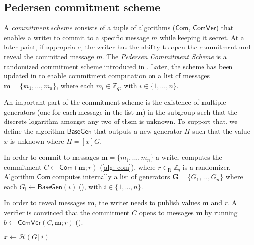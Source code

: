 \clearpage
\subsection{Pedersen commitment scheme}
A \textit{commitment scheme} consists of a tuple of algorithms ($\mathsf{Com}$, $\mathsf{ComVer}$) that enables a writer to commit to a specific message $m$ while keeping it secret. At a later point, if appropriate, the writer has the ability to open the commitment and reveal the committed message $m$. The \textit{Pedersen Commitment Scheme} is a randomized commitment scheme introduced in \cite{Pedersen91-commitment}. Later, the scheme has been updated in \cite{Bootle18} to enable commitment computation on a list of messages $\boldsymbol{m} = \{m_1, ..., m_n\}$, where each $m_i \in \mathbb{Z}_q$, with $i \in \{1, ..., n\}$.

An important part of the commitment scheme is the existence of multiple generators (one for each message in the list  $\boldsymbol{m}$) in the subgroup such that the discrete logarithm amongst any two of them is unknown. To support that, we define the algorithm $\mathsf{BaseGen}$ that outputs a new generator $H$ such that the value $x$ is unknown where $H = [x]G$.

In order to commit to messages $\boldsymbol{m} = \{m_1, ..., m_n\}$ a writer computes the commitment $C \gets \mathsf{Com}(\boldsymbol{m}; r)$ (\ref{alg: com}), where $r \in_\mathrm{R} \mathbb{Z}_q$ is a randomizer. Algorithm $\mathsf{Com}$ computes internally a list of generators $\boldsymbol{G} = \{G_1, ..., G_n\}$ where each $G_i \gets \mathsf{BaseGen}(i)$ (), with $i \in \{1, ..., n\}$.

In order to reveal messages $\boldsymbol{m}$, the writer needs to publish values $\boldsymbol{m}$ and $r$. A verifier is convinced that the commitment $C$ opens to messages $\boldsymbol{m}$ by running $b \gets \mathsf{ComVer}(C, \boldsymbol{m}; r)$ ().

\begin{algorithm}[ht]
    \DontPrintSemicolon
    \caption{$\mathsf{BaseGen} (i)$}
    
    $x \gets \mathcal{H}(G || i)$ \\
     
    
    \label{alg: base gen}
\end{algorithm}

